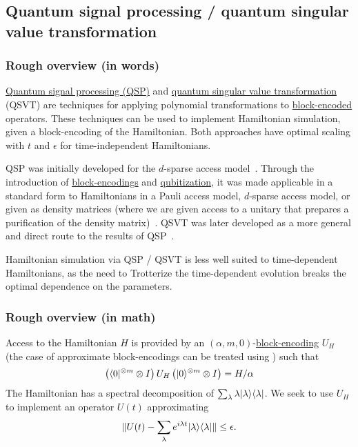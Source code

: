 \begin{refsection}



\subsection{Quantum signal processing / quantum singular value transformation}\label{prim:QSPqubitization}

\subsubsection*{Rough overview (in words)}

\hyperref[prim:QSP]{Quantum signal processing (QSP)} and \hyperref[prim:QSVT]{quantum singular value transformation} (QSVT) are techniques for applying polynomial transformations to \hyperref[prim:BlockEncodings]{block-encoded} operators. These techniques can be used to implement Hamiltonian simulation, given a block-encoding of the Hamiltonian. Both approaches have optimal scaling with $t$ and $\epsilon$ for time-independent Hamiltonians.

QSP was initially developed for the $d$-sparse access model~\cite{low2016HamSimQSignProc}. Through the introduction of \hyperref[prim:BlockEncodings]{block-encodings} and \hyperref[prim:Qubitization]{qubitization}, it was made applicable in a standard form to Hamiltonians in a Pauli access model, $d$-sparse access model, or given as density matrices (where we are given access to a unitary that prepares a purification of the density matrix)~\cite{low2016HamSimQubitization}. QSVT was later developed as a more general and direct route to the results of QSP~\cite{gilyen2018QSingValTransfArXiv}.  

Hamiltonian simulation via QSP / QSVT is less well suited to time-dependent Hamiltonians, as the need to Trotterize the time-dependent evolution breaks the optimal dependence on the parameters.



\subsubsection*{Rough overview (in math)}

Access to the Hamiltonian $H$ is provided by an $(\alpha, m, 0)$-\hyperref[prim:BlockEncodings]{block-encoding} $U_H$ (the case of approximate block-encodings can be treated using \cite[Lemma 22]{gilyen2018QSingValTransfArXiv}) such that
\begin{equation}
    \left(\langle0\rvert^{\otimes m} \otimes I \right) U_H \left(\lvert0\rangle^{\otimes m} \otimes I \right) = H/\alpha 
\end{equation}
The Hamiltonian has a spectral decomposition of $ \sum_\lambda \lambda \lvert\lambda\rangle \langle\lambda\rvert$. We seek to use $U_H$ to implement an operator $U(t)$ approximating 
\begin{equation}
    \lVert U(t) - \sum_\lambda e^{i \lambda t} \lvert\lambda\rangle \langle\lambda\rvert\rVert \leq \epsilon.
\end{equation}


\end{refsection}
